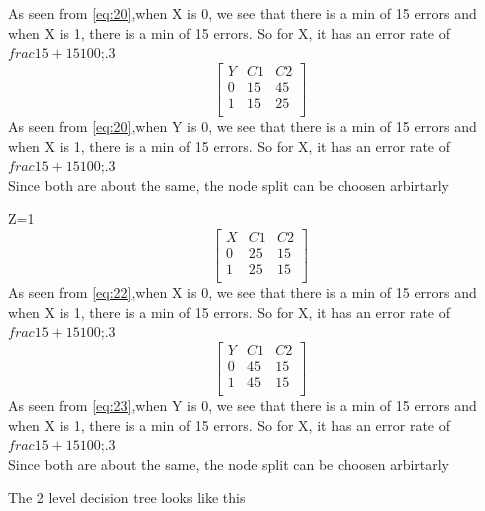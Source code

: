\documentclass[12pt,english]{article}
\begin{document}
As seen from \eqref{eq:20},when X is 0, we see that there is a min of 15 errors and when X is 1, there is a min of 15 errors. So for X, it has an error rate of $frac{15+15}{100}$;.3\\
\begin{equation*}\tag{2}\label{eq:21}
\begin{bmatrix} Y & C1 & C2 \\0 & 15 &  45 \\1 & 15 &  25 \\ \end{bmatrix}
\end{equation*}
As seen from \eqref{eq:20},when Y is 0, we see that there is a min of 15 errors and when X is 1, there is a min of 15 errors. So for X, it has an error rate of $frac{15+15}{100}$;.3\\
Since both are about the same, the node split can be choosen arbirtarly\par
Z=1\\
\begin{equation*}\tag{1}\label{eq:22}
\begin{bmatrix} X & C1 & C2 \\0 & 25 &  15 \\1 & 25 &  15 \\ \end{bmatrix}
\end{equation*}
As seen from \eqref{eq:22},when X is 0, we see that there is a min of 15 errors and when X is 1, there is a min of 15 errors. So for X, it has an error rate of $frac{15+15}{100}$;.3\\
\begin{equation*}\tag{2}\label{eq:23}
\begin{bmatrix} Y & C1 & C2 \\0 & 45 &  15 \\1 & 45 &  15 \\ \end{bmatrix}
\end{equation*}
As seen from \eqref{eq:23},when Y is 0, we see that there is a min of 15 errors and when X is 1, there is a min of 15 errors. So for X, it has an error rate of $frac{15+15}{100}$;.3\\
Since both are about the same, the node split can be choosen arbirtarly\par
The 2 level decision tree looks like this\\
\end{document}
